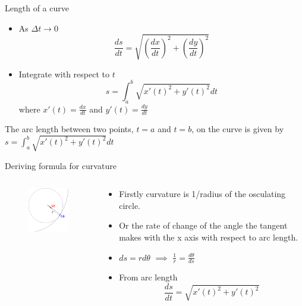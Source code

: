\documentclass{beamer}
\begin{document}
\begin{frame}{Length of a curve}
		\begin{itemize}
		\item As $\Delta t \to 0$
		\[
			\frac{ds}{dt} = \sqrt{\left( \frac{dx}{dt} \right)^2 + \left( \frac{dy}{dt}\right)^2}
		\]
		\item Integrate with respect to $t$ 
		\[
		s =\int_{a}^{b} \sqrt{x'(t)^2 + y'(t)^2}dt
		\]
		where $x'(t) = \frac{dx}{dt}$ and $y'(t) = \frac{dy}{dt}$
		\end{itemize}
	\begin{theorem}
		The arc length between two points, $t = a$ and $t = b$, on the curve is given by
		$s =\int_{a}^{b} \sqrt{x'(t)^2 + y'(t)^2}dt$
	\end{theorem}	
  
\end{frame}

\begin{frame}{Deriving formula for curvature}
	\begin{columns}
		\begin{column}{0.4\textwidth}
			\begin{figure}
				\centering
				\includegraphics[width=50mm, scale=0.4]{curvature_illustration.png}
			\end{figure}
		\end{column}
		\begin{column}{0.6\textwidth}
			\begin{itemize}
				\item Firstly curvature is 1/radius of the osculating circle.
				\item Or the rate of change of the angle the tangent makes with the x axis with respect to arc length.
				\item $ds=rd\theta$ $\implies$ $\frac{1}{r}=\frac{d\theta}{ds}$
				
				\item From arc length 
				\begin{equation} \label{eq:1}
					\frac{ds}{dt} = \sqrt{x'(t)^2+y'(t)^2} 
				\end{equation}
				
				
			
			\end{itemize}
			
			
			
		\end{column}
	\end{columns}

	
\end{frame}
\end{document}
